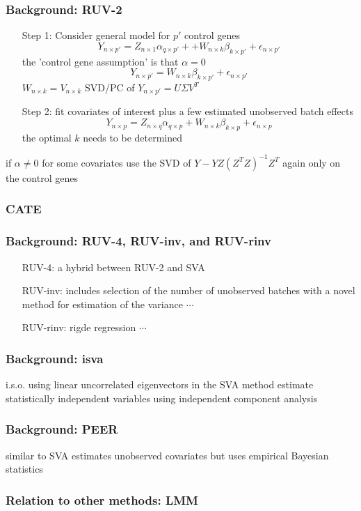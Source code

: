 \documentclass{beamer}
\begin{document}
\begin{frame}
  \frametitle{Background: RUV-2}
  \begin{enumerate}
  \item[Step 1:] Consider general model for $p'$ control genes
    \begin{equation}
      \label{eq:ruv21a}
      Y_{n \times p'} = Z_{n \times 1}\alpha_{q \times p'} +  + W_{n \times k}\beta_{k \times p'} + \epsilon_{n \times p'}
    \end{equation}
    the 'control gene assumption' is that $\alpha = 0$
    \begin{equation}
      \label{eq:ruv21b}
      Y_{n \times p'} = W_{n \times k}\beta_{k \times p'} + \epsilon_{n \times p'}
    \end{equation}
    $W_{n \times k} = V_{n \times k}$ SVD/PC of $Y_{n \times p'} = U \Sigma V^T$
  \item[Step 2:]  fit covariates of interest plus a few estimated unobserved batch effects
    \begin{equation}
      \label{eq:ruvfit}
      Y_{n \times p} = Z_{n \times q}\alpha_{q \times p} + W_{n \times k}\beta_{k \times p} + \epsilon_{n \times p}
    \end{equation}
    the optimal $k$ needs to be determined
  \end{enumerate}
  if $\alpha \neq 0$ for some covariates use the SVD of $Y - YZ(Z^TZ)^{-1}Z^T$ again only on the control genes
\end{frame}

\begin{frame}
  \frametitle{CATE}
\end{frame}


\begin{frame}
  \frametitle{Background: RUV-4, RUV-inv, and RUV-rinv}
  \begin{enumerate}
  \item[RUV-4:] a hybrid between RUV-2 and SVA
  \item[RUV-inv:] includes selection of the number of unobserved batches with a novel method for estimation of the variance $\cdots$
  \item[RUV-rinv:] rigde regression $\cdots$
  \end{enumerate}
\end{frame}

\begin{frame}
  \frametitle{Background: isva}
  i.s.o. using linear uncorrelated eigenvectors in the SVA method estimate statistically independent variables using independent component analysis
\end{frame}

\begin{frame}
  \frametitle{Background: PEER}
  similar to SVA estimates unobserved covariates but uses empirical Bayesian statistics
\end{frame}

\begin{frame}
  \frametitle{Relation to other methods: LMM}
\end{frame}
\end{document}
